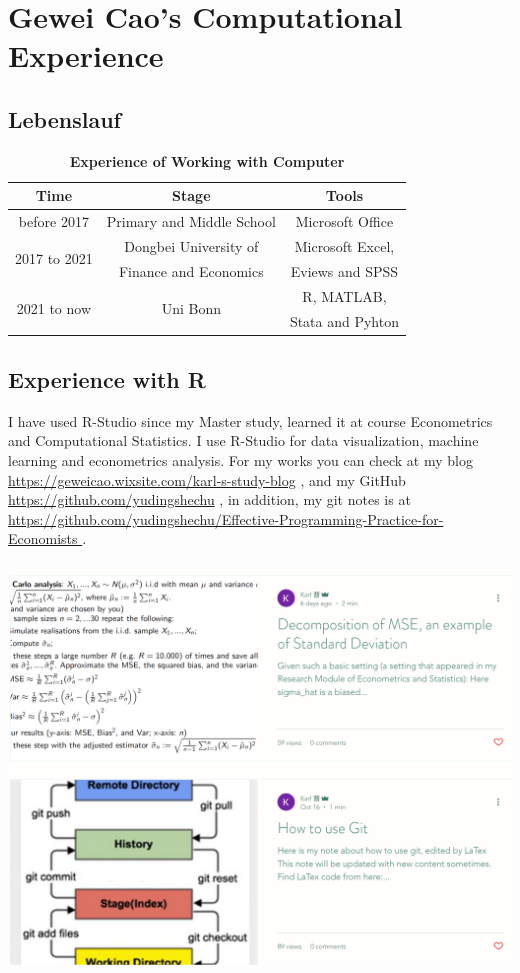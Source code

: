 
\section{Gewei Cao's Computational Experience}
\subsection{Lebenslauf}
\begin{table}[H]
\centering 
\caption{\textbf{Experience of Working with Computer}}
\begin{tabular}{ccc}
\toprule
 Time &  Stage & Tools \\
\midrule
before 2017 & Primary and Middle School  & Microsoft Office \\\hline
\multirow{2}{*}{2017 to 2021} & Dongbei University of  & Microsoft Excel,\\    &  Finance and Economics &   Eviews and SPSS\\ \hline
\multirow{2}{*}{2021 to now} & \multirow{2}{*}{Uni Bonn}  & R, MATLAB, \\ 
 & & Stata and Pyhton\\
\bottomrule
\end{tabular}
\end{table}

\subsection{Experience with R}
\begin{flushleft}
I have used R-Studio since my Master study, learned it at course Econometrics and Computational Statistics. I use R-Studio for data visualization, machine learning and econometrics analysis. For my works you can check at my blog 
\underline{https://geweicao.wixsite.com/karl-s-study-blog} , and my GitHub 
\underline{https://github.com/yudingshechu} , 
in addition, my git notes is at \underline{https://github.com/yudingshechu/Effective-Programming-Practice-for-Economists } . 
\end{flushleft}
\begin{center}
\includegraphics[scale=0.25]{screenshot_ofGewei_blog}
\end{center} 

